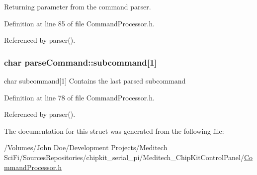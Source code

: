 Returning parameter from the command parser. 



Definition at line 85 of file Command\-Processor.\-h.



Referenced by parser().

\hypertarget{structparse_command_a10312bf6b72a9315a4fb550458bc3ae9}{
\subsubsection[{subcommand}]{\setlength{\rightskip}{0pt plus 5cm}char parse\-Command\-::subcommand\mbox{[}1\mbox{]}}}\label{structparse_command_a10312bf6b72a9315a4fb550458bc3ae9}


char subcommand\mbox{[}1\mbox{]} Contains the last parsed subcommand 



Definition at line 78 of file Command\-Processor.\-h.



Referenced by parser().



The documentation for this struct was generated from the following file\-:\begin{DoxyCompactItemize}
\item 
/\-Volumes/\-John Doe/\-Development Projects/\-Meditech Sci\-Fi/\-Sources\-Repositories/chipkit\-\_\-serial\-\_\-pi/\-Meditech\-\_\-\-Chip\-Kit\-Control\-Panel/\hyperlink{_command_processor_8h}{Command\-Processor.\-h}\end{DoxyCompactItemize}
